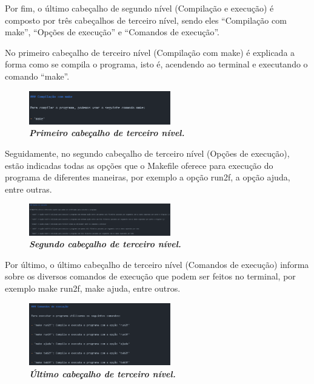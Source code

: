 \documentclass[a4wide]{report}
\begin{document}
{{{{\newpage
Por fim, o último cabeçalho de segundo nível (Compilação e execução) é composto por três cabeçalhos de terceiro nível, sendo eles “Compilação com make”, “Opções de execução” e “Comandos de execução”. 

No primeiro cabeçalho de terceiro nível (Compilação com make) é explicada a forma como se compila o programa, isto é, acendendo ao terminal e executando o comando “make”. 

\begin{figure}[hbt]
    \centering
    \includegraphics[width=0.55\textwidth]{figura4.png}
    \caption{\textbf{\textit{Primeiro cabeçalho de terceiro nível.}}\label{fig:imagem}}
\end{figure}

Seguidamente, no segundo cabeçalho de terceiro nível (Opções de execução), estão indicadas todas as opções que o Makefile oferece para execução do programa de diferentes maneiras, por exemplo a opção run2f, a opção ajuda, entre outras. 

\begin{figure}[hbt]
    \centering
    \includegraphics[width=0.55\textwidth]{figura5.png}
    \caption{\textbf{\textit{Segundo cabeçalho de terceiro nível.}}\label{fig:imagem}}
\end{figure}

Por último, o último cabeçalho de terceiro nível (Comandos de execução) informa sobre os diversos comandos de execução que podem ser feitos no terminal, por exemplo make run2f, make ajuda, entre outros. 

\begin{figure}[hbt]
    \centering
    \includegraphics[width=0.55\textwidth]{figura6.png}
    \caption{\textbf{\textit{Último cabeçalho de terceiro nível.}}\label{fig:imagem}}
\end{figure}

}}}}
\end{document}
